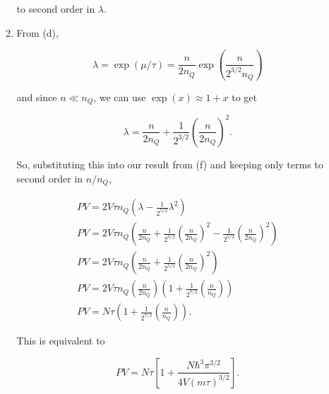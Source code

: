 \documentclass{article}
\begin{document}
\begin{enumerate}
\begin{enumerate}
		to second order in $\lambda$.

		\item

		From (d),

		$$\lambda = \exp(\mu/\tau) = \frac{n}{2n_Q}\exp \left( \frac{n}{2^{3/2}n_Q} \right)$$

		and since $n \ll n_Q$, we can use $\exp(x) \approx 1+x$ to get

		$$\lambda = \frac{n}{2n_Q} + \frac{1}{2^{3/2}} \left(\frac{n}{2n_Q}\right)^2.$$

		So, substituting this into our result from (f) and keeping only terms to second order in $n/n_Q$,

		\begin{gather*}
		PV = 2V\tau n_Q \left( \lambda - \frac{1}{2^{5/2}} \lambda^2 \right) \\
		PV = 2V\tau n_Q \left( \frac{n}{2n_Q} + \frac{1}{2^{3/2}} \left(\frac{n}{2n_Q}\right)^2 - \frac{1}{2^{5/2}} \left(\frac{n}{2n_Q}\right)^2 \right) \\
		PV = 2V\tau n_Q \left( \frac{n}{2n_Q} + \frac{1}{2^{5/2}} \left(\frac{n}{2n_Q}\right)^2 \right) \\
		PV = 2V\tau n_Q \left(\frac{n}{2n_Q} \right) \left(1 + \frac{1}{2^{7/2}} \left(\frac{n}{n_Q}\right) \right) \\
		PV = N \tau  \left(1 + \frac{1}{2^{7/2}} \left(\frac{n}{n_Q}\right) \right).
		\end{gather*}

		This is equivalent to

		$$PV = N \tau \left[ 1 + \frac{N\hbar^3 \pi^{3/2}}{4V(m\tau)^{3/2}} \right].$$

	\end{enumerate}

\end{enumerate}
\end{document}
